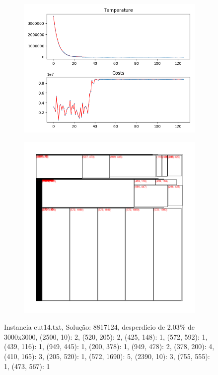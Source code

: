 \begin{figure}
\centering
\begin{subfigure}{.5\textwidth}
  \centering
  \includegraphics[width=1\linewidth]{results/cut14/2/plot}
  \label{fig:sub1}
\end{subfigure}%
\begin{subfigure}{.5\textwidth}
  \centering
  \includegraphics[width=1\linewidth]{results/cut14/2/cut}
  \label{fig:sub2}
\end{subfigure}
\caption{Instancia cut14.txt, Solução: 8817124, desperdício de 2.03\% de 3000x3000, {(2500, 10): 2, (520, 205): 2, (425, 148): 1, (572, 592): 1, (439, 116): 1, (949, 445): 1, (200, 378): 1, (949, 478): 2, (378, 200): 4, (410, 165): 3, (205, 520): 1, (572, 1690): 5, (2390, 10): 3, (755, 555): 1, (473, 567): 1}}
\label{fig:test}
\end{figure}


